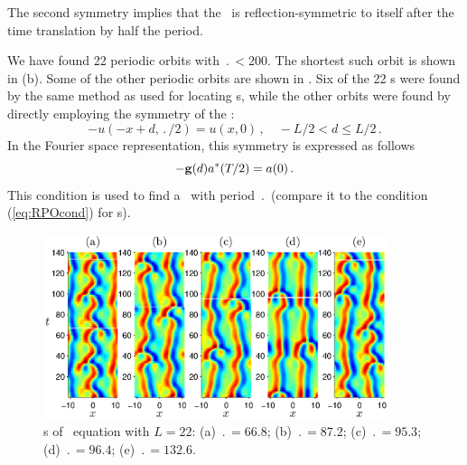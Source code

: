The second symmetry implies that the \rpo\ is reflection-\-sym\-metric
to itself after the time translation by half the period.

We have found 22 periodic orbits 
with $\period{} < 200$.  The
shortest such orbit is shown in (b).  Some
of the other periodic orbits are shown in . Six
of the 22 \po s were found by the same method as used for locating
\rpo s, while the other orbits were found by directly employing the
symmetry of the \po:
\[ -u(-x+d,\period{}/2) = u(x,0)\,, \quad -L/2 < d \leq L/2\,.\]
In the Fourier space representation, this symmetry is expressed as
follows
\[
 -{\bf g}(d)a^\ast({T_{}}/2) = a(0)\,.
\]
This condition is used to find a \po\ with period $\period{}$ (compare it to
the condition (\ref{eq:RPOcond}) for \rpo s). 


\begin{figure}[t] \label{f:ks22rposPO}
\begin{center}
\includegraphics[width=0.9\textwidth]{figs/ks22rposPO.eps}
\end{center}
\caption{
\Po s of \KS\ equation with $L = 22$: (a) $\period{} =
66.8$; (b) $\period{} = 87.2$; (c) $\period{} = 95.3$; (d) $\period{} = 96.4$; (e) $\period{} =
132.6$.
        }
\end{figure}

